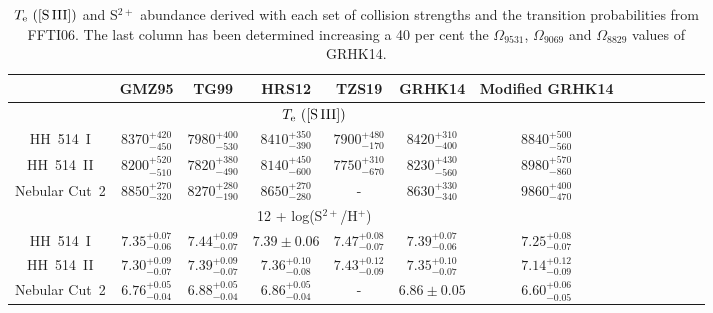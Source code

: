 \documentclass[fleqn,usenatbib]{mnras}
\begin{document}
\begin{table}
\centering
\caption{$T_{\rm e} \text{ ([S\thinspace III])}$ and S$^{2+}$ abundance derived with each set of collision strengths and the transition probabilities from FFTI06. The last column has been determined increasing a 40 per cent the  $\Omega_{9531}$, $\Omega_{9069}$ and $\Omega_{8829}$ values of GRHK14.}
\label{tab:modified_data_omega}
\begin{adjustbox}{width=\textwidth}
\begin{tabular}{ccccccccccccc}
\hline
 &  GMZ95 & TG99 & HRS12 &  TZS19 & GRHK14 & Modified GRHK14\\
\hline

\multicolumn{7}{c}{$T_{\rm e} \text{ ([S\thinspace III])}$} \\ 

HH~514~I  & $8370^{+420} _{-450}$ & $7980^{+400} _{-530}$ & $8410^{+350} _{-390}$ & $7900^{+480} _{-170}$ & $8420^{+310} _{-400}$ & $8840^{+500} _{-560}$ \\

HH~514~II & $8200^{+520} _{-510}$ & $7820^{+380} _{-490}$ & $8140^{+450} _{-600}$& $7750^{+310} _{-670}$ & $8230^{+430} _{-560}$ & $8980^{+570} _{-860}$\\

Nebular Cut~2 & $8850^{+270} _{-320}$ & $8270^{+280} _{-190}$ & $8650^{+270} _{-280}$ & - & $8630^{+330} _{-340}$ & $9860^{+400} _{-470}$\\
\hline

\multicolumn{7}{c}{12 + log(S$^{2+}$/H$^{+}$)} \\

HH~514~I & $7.35^{+0.07} _{-0.06}$ & $7.44^{+0.09} _{-0.07}$&$7.39 \pm 0.06 $& $7.47^{+0.08} _{-0.07}$& $7.39^{+0.07} _{-0.06}$& $7.25^{+0.08} _{-0.07}$\\

HH~514~II & $7.30^{+0.09} _{-0.07}$ & $7.39^{+0.09} _{-0.07}$& $7.36^{+0.10} _{-0.08}$& $7.43^{+0.12} _{-0.09}$ & $7.35^{+0.10} _{-0.07}$&  $7.14^{+0.12} _{-0.09}$\\

Nebular Cut~2 &$6.76^{+0.05} _{-0.04}$ &$6.88^{+0.05} _{-0.04}$ &$6.86^{+0.05} _{-0.04}$ & -& $6.86 \pm 0.05 $ & $6.60^{+0.06} _{-0.05}$ \\

\hline
\end{tabular}
\end{adjustbox}
\end{table}
\end{document}
